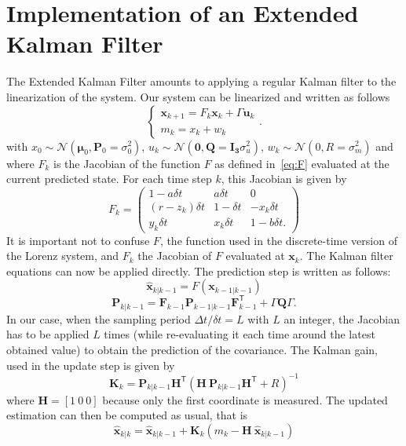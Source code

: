 \documentclass[english, DIV=13]{scrartcl}
\renewcommand{\vec}[1]{\mathbf{#1}}
\begin{document}
\section{Implementation of an Extended Kalman Filter}
The Extended Kalman Filter amounts to applying a regular Kalman filter to the
linearization of the system. Our system can be linearized and written as follows
\begin{equation*}
    \begin{cases}
        \vec{x}_{k+1} = F_k\vec{x}_k + \Gamma\vec{u}_k \\
        m_k = x_k + w_k
    \end{cases}.
\end{equation*}
with $x_0 \sim\mathcal{N}(\vec{\mu}_0, \vec{P}_0 = \sigma^2_0)$, $u_k
\sim\mathcal{N}(\vec{0}, \vec{Q} = \vec{I_3}\sigma^2_u)$,
$w_k \sim\mathcal{N}(0, R = \sigma^2_m)$ and where $F_k$ is the Jacobian of the
function $F$ as defined in~\eqref{eq:F} evaluated at the current predicted state.
For each time step $k$, this Jacobian is given by
\begin{equation*}
    F_k = 
    \begin{pmatrix}
        1 - a \delta t & a \delta t & 0 \\
        (r - z_k) \delta t & 1 - \delta t & - x_k \delta t \\
        y_k \delta t & x_k \delta t & 1 - b \delta t.
    \end{pmatrix}
\end{equation*}
It is important not to confuse $F$, the function used in the discrete-time version of
the Lorenz system, and $F_k$ the Jacobian of $F$ evaluated at $\vec{x}_k$.
The Kalman filter equations can now be applied directly. The prediction step is written
as follows:
\[ \vec{\hat{x}}_{k|k-1} = F(\vec{x}_{k-1|k-1}) \]
\[ \vec{P}_{k|k-1} = \vec{F}_{k-1} \vec{P}_{k-1|k-1} \vec{F}_{k-1}^\mathsf{T} + 
\Gamma\vec{Q}\Gamma. \]
In our case, when the sampling period $\Delta t/\delta t = L$ with $L$ an integer, the
Jacobian has to be applied $L$ times (while re-evaluating it each time around the latest
obtained value) to obtain the prediction of the covariance.  
The Kalman gain, used in the update step is given by
\[ \vec{K}_k = \vec{P}_{k|k-1} \vec{H}^\mathsf{T} (\vec{H} ~ \vec{P}_{k|k-1}
\vec{H}^\mathsf{T} + R)^{-1} \]
where $\vec{H} = \left[1~0~0\right]$ because only the first coordinate is measured.
The updated estimation can then be computed as usual, that is
\[ \vec{\hat{x}}_{k|k} = \vec{\hat{x}}_{k|k-1} + \vec{K}_k (m_k  - \vec{H} ~
\vec{\hat{x}}_{k|k-1}) \]
\end{document}
